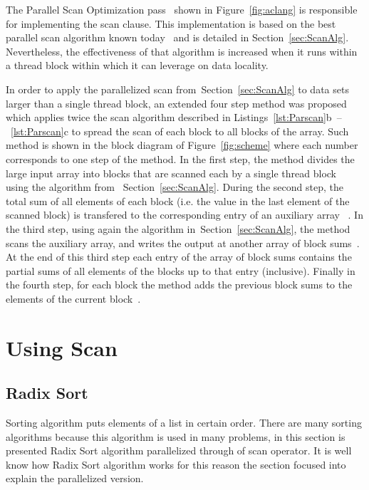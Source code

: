 \documentclass[Ingles]{ic-tese-v1}
\newcommand{\rsec}[1]{Section~\ref{sec:#1}}
\newcommand{\rfig}[1]{Figure~\ref{fig:#1}}
\newcommand{\rlstn}[3]{Listings~\ref{lst:#1}{#2}~--~\ref{lst:#1}{#3}}
\begin{document}
The Parallel Scan Optimization  pass~ shown in \rfig{aclang}
is responsible  for implementing the scan  clause. This implementation
is    based   on    the   best    parallel   scan    algorithm   known
today~\cite{Sengupta:2007}       and       is       detailed       in
\rsec{ScanAlg}.  Nevertheless, the  effectiveness  of  that algorithm  is
increased  when it  runs within  a thread  block within  which it  can
leverage on data locality.

In order to apply the  parallelized scan from~\rsec{ScanAlg} to data sets
larger than  a single thread block,  an extended four step  method was
proposed~\cite{harris2007parallel}  which   applies  twice   the  scan
algorithm described in \rlstn{Parscan}{b}{c} to spread the scan of each
block to all blocks  of the array.  Such method is  shown in the block
diagram of \rfig{scheme} where each  number corresponds to one step of
the method.   In the first  step, the  method divides the  large input
array  into  blocks  that  are   scanned  each  by  a  single  thread
block~ using  the algorithm  from ~\rsec{ScanAlg}.   During the
second step,  the total sum  of all elements  of each block  (i.e. the
value in the  last element of the scanned block)  is transfered to the
corresponding entry of  an auxiliary array ~.   In the third
step, using again  the algorithm in~\rsec{ScanAlg}, the  method scans the
auxiliary  array, and  writes the  output  at another  array of  block
sums~.  At  the end  of this  third step  each entry  of the
array of block  sums contains the partial sums of  all elements of the
blocks up to that entry (inclusive).   Finally in the fourth step,
for each block the method adds the previous block sums  to the elements of the current
block~.

\chapter{Using Scan}
\label{sec:ScanUse}

\section{Radix Sort}
\label{sec:Quicksort}

Sorting algorithm puts elements of a list in certain order.
There are many sorting algorithms because this algorithm is used 
in many problems, in this section is presented Radix Sort algorithm
parallelized through of scan operator. It is well know how Radix Sort
algorithm works for this reason the section focused into explain the 
parallelized version.
\end{document}
